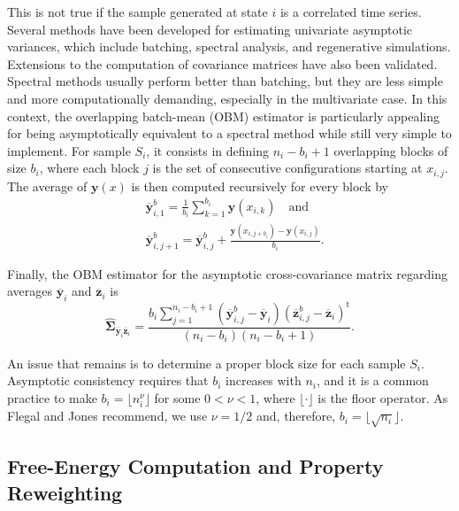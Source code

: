 \documentclass[aip,jcp,reprint,amsmath,amssymb]{revtex4-1}
\newcommand{\mt}[1]{\boldsymbol{\mathbf{#1}}}           %
\newcommand{\vt}[1]{\boldsymbol{\mathbf{#1}}}           %
\newcommand{\tr}[1]{#1^\text{t}}                        %
\begin{document}
This is not true if the sample generated at state $i$ is a correlated time series. Several methods have been developed for estimating univariate asymptotic variances, which include batching, spectral analysis, and regenerative simulations.\cite{Geyer_1992, Alexopoulos_2006, Flegal_2010, Doss_2014} Extensions to the computation of covariance matrices have also been validated.\cite{Vats_2015, Vats_2017} Spectral methods usually perform better than batching,\cite{Flegal_2010} but they are less simple and more computationally demanding, especially in the multivariate case.\cite{Vats_2015} In this context, the overlapping batch-mean (OBM) estimator\cite{Meketon_1984} is particularly appealing for being asymptotically equivalent to a spectral method while still very simple to implement. For sample $S_i$, it consists in defining $n_i-b_i+1$ overlapping blocks of size $b_i$, where each block $j$ is the set of consecutive configurations starting at $x_{i,j}$. The average of $\vt y(x)$ is then computed recursively for every block by
\begin{align*}
&{\overline{\vt y}}^b_{i,1} = \frac{1}{b_i} \sum_{k=1}^{b_i} \vt y(x_{i,k}) \quad \text{and} \\
&{\overline{\vt y}}^b_{i,j+1} = {\overline{\vt y}}^b_{i,j} + \frac{\vt y(x_{i,j+b_i}) - \vt y(x_{i,j})}{b_i}.
\end{align*}

Finally, the OBM estimator for the asymptotic cross-covariance matrix regarding averages $\overline{\vt y}_i$ and $\overline{\vt z}_i$ is\cite{Meketon_1984}
\begin{equation}
\label{eq:obm asymptotic covariance}
\hat{\mt \Sigma}_{\overline{\vt y}_i\overline{\vt z}_i} = \frac{b_i \sum\limits_{j=1}^{n_i - b_i + 1} ({\overline{\vt y}}^b_{i,j} - \overline{\vt y}_i) \tr{({\overline{\vt z}}^b_{i,j} - \overline{\vt z}_i)}}{(n_i - b_i)(n_i - b_i + 1)}.
\end{equation}

An issue that remains is to determine a proper block size for each sample $S_i$. Asymptotic consistency requires that $b_i$ increases with $n_i$, and it is a common practice to make $b_i = \lfloor n_i^\nu \rfloor$ for some $0 < \nu < 1$, where $\lfloor \cdot \rfloor$ is the floor operator. As Flegal and Jones\cite{Flegal_2010} recommend, we use $\nu = 1/2$ and, therefore, $b_i = \lfloor \sqrt{n_i} \rfloor$.

\subsection{Free-Energy Computation and Property Reweighting}
\end{document}
